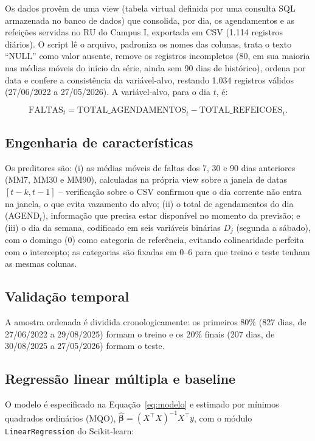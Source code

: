 \documentclass[11pt]{article}
\begin{document}
Os dados provêm de uma view (tabela virtual definida por uma consulta SQL armazenada no banco de dados) que consolida, por dia, os agendamentos e as refeições servidas no RU do Campus I, exportada em CSV (1.114 registros diários). O script lê o arquivo, padroniza os nomes das colunas, trata o texto ``NULL'' como valor ausente, remove os registros incompletos (80, em sua maioria nas médias móveis do início da série, ainda sem 90 dias de histórico), ordena por data e confere a consistência da variável-alvo, restando 1.034 registros válidos (27/06/2022 a 27/05/2026). A variável-alvo, para o dia $t$, é:

\begin{equation}
\text{FALTAS}_t = \text{TOTAL\_AGENDAMENTOS}_t - \text{TOTAL\_REFEICOES}_t.
\label{eq:faltas}
\end{equation}

\subsection{Engenharia de características}

Os preditores são: (i) as médias móveis de faltas dos 7, 30 e 90 dias anteriores (MM7, MM30 e MM90), calculadas na própria view sobre a janela de datas $[t-k,t-1]$ -- verificação sobre o CSV confirmou que o dia corrente não entra na janela, o que evita vazamento do alvo; (ii) o total de agendamentos do dia (AGEND$_t$), informação que precisa estar disponível no momento da previsão; e (iii) o dia da semana, codificado em seis variáveis binárias $D_j$ (segunda a sábado), com o domingo (0) como categoria de referência, evitando colinearidade perfeita com o intercepto; as categorias são fixadas em 0--6 para que treino e teste tenham as mesmas colunas.

\subsection{Validação temporal}

A amostra ordenada é dividida cronologicamente: os primeiros 80\% (827 dias, de 27/06/2022 a 29/08/2025) formam o treino e os 20\% finais (207 dias, de 30/08/2025 a 27/05/2026) formam o teste.

\subsection{Regressão linear múltipla e baseline}

O modelo é especificado na Equação~\ref{eq:modelo} e estimado por mínimos quadrados ordinários (MQO), $\hat{\boldsymbol{\beta}}=(X^{\top}X)^{-1}X^{\top}y$, com o módulo \texttt{LinearRegression} do Scikit-learn:
\end{document}
